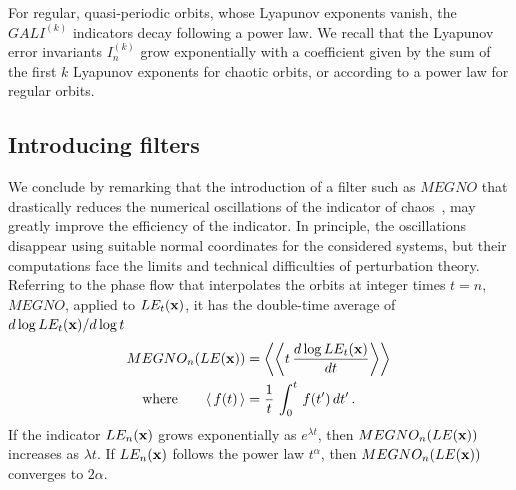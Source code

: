 For regular, quasi-periodic  orbits,  whose Lyapunov exponents vanish, the $GALI^{(k)}$ indicators decay following a power law. We recall that the Lyapunov error invariants $I_n^{(k)}$ grow exponentially with a coefficient given by the sum of the first $k$ Lyapunov exponents for chaotic orbits, or according to a power law for regular orbits. %

%
\subsection{Introducing filters}
%
We conclude by remarking that the introduction of a filter such as $MEGNO$ that drastically reduces the numerical oscillations of the indicator of chaos~\cite{Gozdziewski01, Cincotta2016}, may greatly improve the efficiency of the indicator. In principle, the oscillations disappear using suitable normal coordinates for the considered systems, but their computations face the limits and technical difficulties of perturbation theory. Referring to the phase flow that interpolates the orbits at integer times $t=n$, $MEGNO$, applied to $LE_t(\vb{x})$, it has the double-time average of $d\log LE_t(\vb{x})/d\log t$  %
%
\begin{equation}
\begin{split}
    MEGNO_n(LE(\vb{x})) & =  %
   \left\langle\left\langle  t\, \frac{d\log LE_t(\vb{x})}{ dt}\right \rangle \right \rangle\, \\
 \text{where} \qquad \mean{f(t)}& = \frac{1}{ t}\,\int_0^t \,f(t')\,dt' \, .
\end{split}
\label{eq3-23}
\end{equation}
%
If the indicator $LE_n(\vb{x})$ grows exponentially as $e^{\lambda t}$, then $MEGNO_n(LE(\vb{x}))$ increases as $\lambda t$. If $LE_n(\vb{x})$ follows the power law $t^\alpha$, then $MEGNO_n(LE(\vb{x}))$ converges to $2\alpha$.%

